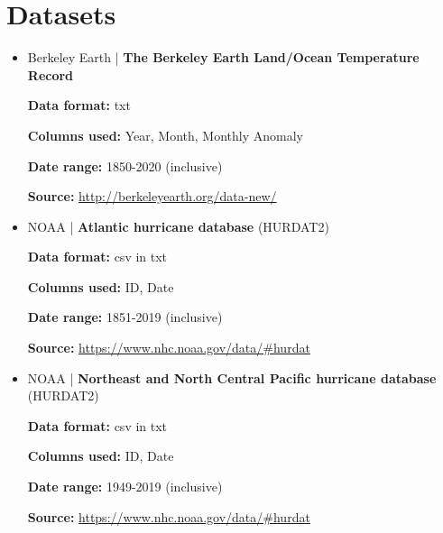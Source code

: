 \documentclass[fontsize=11pt]{article}
\begin{document}
\section*{Datasets}
\begin{itemize}

    \item Berkeley Earth | \textbf{The Berkeley Earth Land/Ocean Temperature Record}

    \medskip

    \textbf{Data format:} txt

    \textbf{Columns used:} Year, Month, Monthly Anomaly

    \textbf{Date range:} 1850-2020 (inclusive)

    \textbf{Source:}
    \url{http://berkeleyearth.org/data-new/}

    \bigskip

    \item NOAA | \textbf{Atlantic hurricane database} (HURDAT2)

    \medskip

    \textbf{Data format:} csv in txt

    \textbf{Columns used:} ID, Date

    \textbf{Date range:} 1851-2019 (inclusive)

    \textbf{Source:}
    \url{https://www.nhc.noaa.gov/data/#hurdat}

    \bigskip

    \item NOAA | \textbf{Northeast and North Central Pacific hurricane database} (HURDAT2)

    \medskip

    \textbf{Data format:} csv in txt

    \textbf{Columns used:} ID, Date

    \textbf{Date range:} 1949-2019 (inclusive)

    \textbf{Source:}
    \url{https://www.nhc.noaa.gov/data/#hurdat}

\end{itemize}
\end{document}
